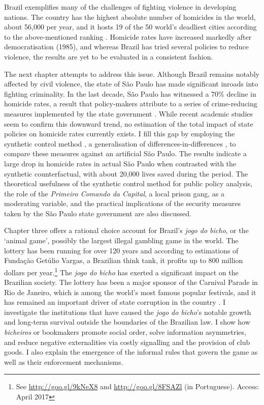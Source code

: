 Brazil exemplifies many of the challenges of fighting violence in developing nations. The country has the highest absolute number of homicides in the world, about 56,000 per year, and it hosts 19 of the 50 world's deadliest cities according to the above-mentioned ranking \citep{mapa2014, mexico2014,unodc2013}. Homicide rates have increased markedly after democratisation (1985), and whereas Brazil has tried several policies to reduce violence, the results are yet to be evaluated in a consistent fashion. 

The next chapter attempts to address this issue. Although Brazil remains notably affected by civil violence, the state of São Paulo has made significant inroads into fighting criminality. In the last decade, São Paulo has witnessed a 70\% decline in homicide rates, a result that policy-makers attribute to a series of crime-reducing measures implemented by the state government \citep{goertzel2009,kahn2005papel}. While recent academic studies seem to confirm this downward trend, no estimation of the total impact of state policies on homicide rates currently exists. I fill this gap by employing the synthetic control method \citep{abadie2003,abadie2010,abadie2014}, a generalisation of differences-in-differences \citep{angrist2008mostly,bertrand2004much,imbens2009recent}, to compare these measures against an artificial São Paulo. The results indicate a large drop in homicide rates in actual São Paulo when contrasted with the synthetic counterfactual, with about 20,000 lives saved during the period. The theoretical usefulness of the synthetic control method for public policy analysis, the role of the \textit{Primeiro Comando da Capital}, a local prison gang, as a moderating variable, and the practical implications of the security measures taken by the São Paulo state government are also discussed.

Chapter three offers a rational choice account for Brazil's \textit{jogo do bicho}, or the `animal game', possibly the largest illegal gambling game in the world. The lottery has been running for over 120 years and according to estimations of Fundação Getúlio Vargas, a Brazilian think tank, it profits up to 800 million dollars per year.\footnote{See \url{http://goo.gl/9kNeX8} and \url{http://goo.gl/8FSAZl} (in Portuguese). Access: April 2017} The \emph{jogo do bicho} has exerted a significant impact on the Brazilian society. The lottery has been a major sponsor of the Carnival Parade in Rio de Janeiro, which is among the world's most famous popular festivals, and it has remained an important driver of state corruption in the country \citep{bezerra2009mecenato,chazkel2011laws,da1999aguias,labronici2012paratodos,magalhaes2005ganhou,soares1993jogo}. I investigate the institutions that have caused the \emph{jogo do bicho}'s notable growth and long-term survival outside the boundaries of the Brazilian law. I show how \textit{bicheiros} or bookmakers promote social order, solve information asymmetries, and reduce negative externalities via costly signalling and the provision of club goods. I also explain the emergence of the informal rules that govern the game as well as their enforcement mechanisms.

